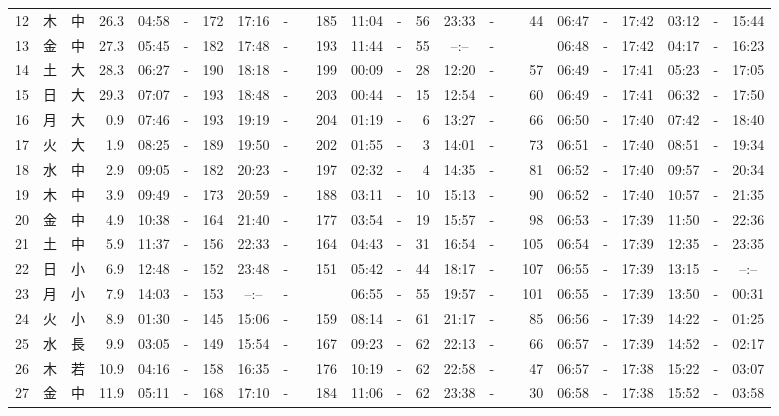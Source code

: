 \documentclass[12pt,a4j]{jsarticle}
\begin{document}
\begin{table}[htbp]
\begin{center}
{\begin{tabular}{|rc|cr|ccrccr|ccrccr|ccc|ccc|}
12 & 木 & 中 & 26.3 &  04:58 &-& 172 &  17:16 &-& 185 &  11:04 &-&  56 &  23:33 &-&  44 & 06:47 & -& 17:42 & 03:12 & -& 15:44 \\
13 & 金 & 中 & 27.3 &  05:45 &-& 182 &  17:48 &-& 193 &  11:44 &-&  55 &  --:-- &-&~~~~~ & 06:48 & -& 17:42 & 04:17 & -& 16:23 \\
14 & 土 & 大 & 28.3 &  06:27 &-& 190 &  18:18 &-& 199 &  00:09 &-&  28 &  12:20 &-&  57 & 06:49 & -& 17:41 & 05:23 & -& 17:05 \\
15 & 日 & 大 & 29.3 &  07:07 &-& 193 &  18:48 &-& 203 &  00:44 &-&  15 &  12:54 &-&  60 & 06:49 & -& 17:41 & 06:32 & -& 17:50 \\
16 & 月 & 大 &  0.9 &  07:46 &-& 193 &  19:19 &-& 204 &  01:19 &-&   6 &  13:27 &-&  66 & 06:50 & -& 17:40 & 07:42 & -& 18:40 \\
17 & 火 & 大 &  1.9 &  08:25 &-& 189 &  19:50 &-& 202 &  01:55 &-&   3 &  14:01 &-&  73 & 06:51 & -& 17:40 & 08:51 & -& 19:34 \\
18 & 水 & 中 &  2.9 &  09:05 &-& 182 &  20:23 &-& 197 &  02:32 &-&   4 &  14:35 &-&  81 & 06:52 & -& 17:40 & 09:57 & -& 20:34 \\
19 & 木 & 中 &  3.9 &  09:49 &-& 173 &  20:59 &-& 188 &  03:11 &-&  10 &  15:13 &-&  90 & 06:52 & -& 17:40 & 10:57 & -& 21:35 \\
20 & 金 & 中 &  4.9 &  10:38 &-& 164 &  21:40 &-& 177 &  03:54 &-&  19 &  15:57 &-&  98 & 06:53 & -& 17:39 & 11:50 & -& 22:36 \\
21 & 土 & 中 &  5.9 &  11:37 &-& 156 &  22:33 &-& 164 &  04:43 &-&  31 &  16:54 &-& 105 & 06:54 & -& 17:39 & 12:35 & -& 23:35 \\
22 & 日 & 小 &  6.9 &  12:48 &-& 152 &  23:48 &-& 151 &  05:42 &-&  44 &  18:17 &-& 107 & 06:55 & -& 17:39 & 13:15 & -& --:-- \\
23 & 月 & 小 &  7.9 &  14:03 &-& 153 &  --:-- &-&~~~~~ &  06:55 &-&  55 &  19:57 &-& 101 & 06:55 & -& 17:39 & 13:50 & -& 00:31 \\
24 & 火 & 小 &  8.9 &  01:30 &-& 145 &  15:06 &-& 159 &  08:14 &-&  61 &  21:17 &-&  85 & 06:56 & -& 17:39 & 14:22 & -& 01:25 \\
25 & 水 & 長 &  9.9 &  03:05 &-& 149 &  15:54 &-& 167 &  09:23 &-&  62 &  22:13 &-&  66 & 06:57 & -& 17:39 & 14:52 & -& 02:17 \\
26 & 木 & 若 & 10.9 &  04:16 &-& 158 &  16:35 &-& 176 &  10:19 &-&  62 &  22:58 &-&  47 & 06:57 & -& 17:38 & 15:22 & -& 03:07 \\
27 & 金 & 中 & 11.9 &  05:11 &-& 168 &  17:10 &-& 184 &  11:06 &-&  62 &  23:38 &-&  30 & 06:58 & -& 17:38 & 15:52 & -& 03:58 \\

\end{tabular}}
\end{center}
\end{table}
\end{document}
